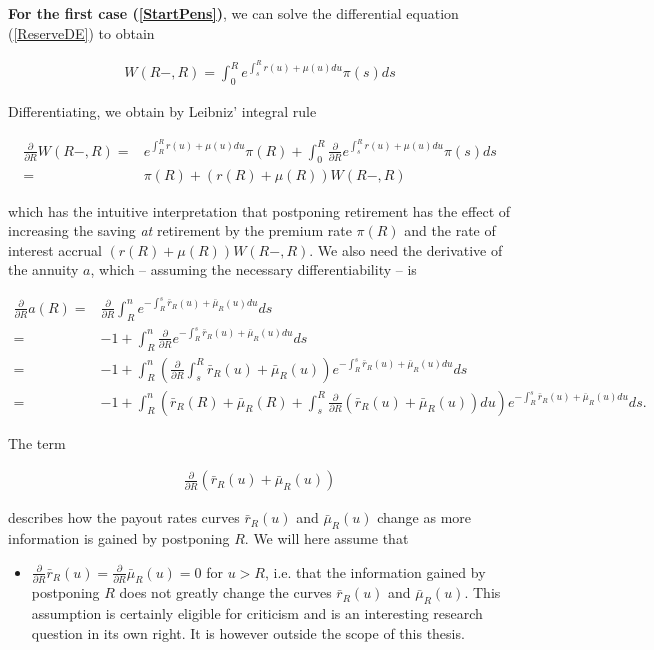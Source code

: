 \documentclass{article}
\newcommand{\1}[1]{\mathbbm{1}_{\left\lbrace #1 \right\rbrace}}
\theoremstyle{break}
\theoremstyle{remark}
\numberwithin{equation}{section}
\begin{document}
\textbf{For the first case (\ref{StartPens})}, we can solve the differential equation (\ref{ReserveDE}) to obtain

\begin{align} \label{ReserveAtRetirement}
	W(R-,R) = \int_0^R e^{\int_s^R r(u) + \mu(u) du} \pi(s) ds
\end{align}

Differentiating, we obtain by Leibniz' integral rule

\begin{align*}
	\frac{\partial}{\partial R} W(R-,R) =& e^{\int_R^R r(u) + \mu(u) du} \pi(R) + \int_0^R \frac{\partial}{\partial R} e^{\int_s^R r(u) + \mu(u) du} \pi(s) ds \\
	=& \pi(R) + \left(r(R) + \mu(R)\right) W(R-,R)
\end{align*}

which has the intuitive interpretation that postponing retirement has the effect of increasing the saving \textit{at} retirement by the premium rate $\pi(R)$ and the rate of interest accrual $\left(r(R) + \mu(R)\right) W(R-,R)$. We also need the derivative of the annuity $a$, which  -- assuming the necessary differentiability -- is

\begin{align*}
	\frac{\partial}{\partial R} a(R) =& \frac{\partial}{\partial R} \int_R^n e^{-\int_R^s \bar{r}_R(u) + \bar{\mu}_R(u) du} ds \\
	=& - 1 + \int_R^n \frac{\partial}{\partial R} e^{-\int_R^s \bar{r}_R(u) + \bar{\mu}_R(u) du} ds \\
	=& - 1 + \int_R^n \left( \frac{\partial}{\partial R} \int_s^R \bar{r}_R(u) + \bar{\mu}_R(u) \right) e^{-\int_R^s \bar{r}_R(u) + \bar{\mu}_R(u) du} ds \\
	=& - 1 + \int_R^n \left( \bar{r}_R(R) + \bar{\mu}_R(R) + \int_s^R 	\frac{\partial}{\partial R} \left(\bar{r}_R(u)+\bar{\mu}_R(u)\right) du \right) e^{-\int_R^s \bar{r}_R(u) + \bar{\mu}_R(u) du} ds.
\end{align*}

The term

\begin{align*}
	\frac{\partial}{\partial R} \left(\bar{r}_R(u)+\bar{\mu}_R(u)\right)
\end{align*}

describes how the payout rates curves $\bar{r}_R(u)$ and $\bar{\mu}_R(u)$ change as more information is gained by postponing $R$. We will here assume that

\begin{itemize}
	\item $\frac{\partial}{\partial R} \bar{r}_R(u) = \frac{\partial}{\partial R} \bar{\mu}_R(u) = 0$ for $u > R$, i.e. that the information gained by postponing $R$ does not greatly change the curves $\bar{r}_R(u)$ and $\bar{\mu}_R(u)$. This assumption is certainly eligible for criticism and is an interesting research question in its own right. It is however outside the scope of this thesis.
\end{itemize}
\end{document}
